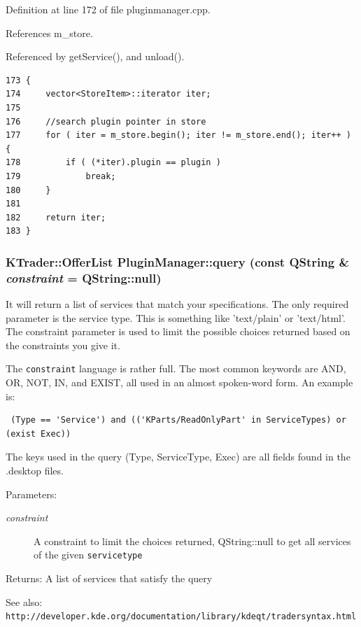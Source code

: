 Definition at line 172 of file pluginmanager.cpp.

References m\_\-store.

Referenced by get\-Service(), and unload().



\footnotesize\begin{verbatim}173 {
174     vector<StoreItem>::iterator iter; 
175     
176     //search plugin pointer in store
177     for ( iter = m_store.begin(); iter != m_store.end(); iter++ ) {
178         if ( (*iter).plugin == plugin )
179             break;
180     }
181 
182     return iter;
183 }
\end{verbatim}\normalsize 
{}
\subsubsection{\setlength{\rightskip}{0pt plus 5cm}KTrader::Offer\-List Plugin\-Manager::query (const QString \& {\em constraint} = QString::null)\hspace{0.3cm}{\tt  [static]}}\label{classPluginManager_PluginManagere0}


It will return a list of services that match your specifications. The only required parameter is the service type. This is something like 'text/plain' or 'text/html'. The constraint parameter is used to limit the possible choices returned based on the constraints you give it.

The {\tt constraint} language is rather full. The most common keywords are AND, OR, NOT, IN, and EXIST, all used in an almost spoken-word form. An example is: 

\footnotesize\begin{verbatim} (Type == 'Service') and (('KParts/ReadOnlyPart' in ServiceTypes) or (exist Exec))
\end{verbatim}
\normalsize


The keys used in the query (Type, Service\-Type, Exec) are all fields found in the .desktop files.

\begin{Desc}
\item[Parameters:]
\begin{description}
\item[{\em constraint}]A constraint to limit the choices returned, QString::null to get all services of the given {\tt servicetype} \end{description}
\end{Desc}
\begin{Desc}
\item[Returns:]A list of services that satisfy the query \end{Desc}
\begin{Desc}
\item[See also:]{\tt http://developer.kde.org/documentation/library/kdeqt/tradersyntax.html} \end{Desc}


